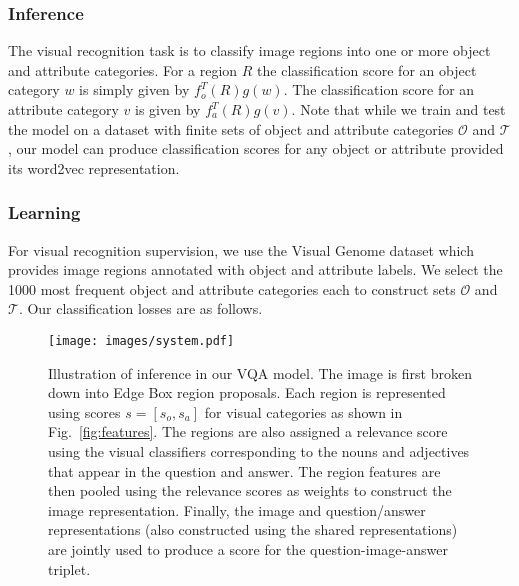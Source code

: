 \documentclass[10pt,twocolumn,letterpaper]{article}
\begin{document}
\subsubsection{Inference}\label{sec:recog_inference}
The visual recognition task is to classify image regions into one or more object and attribute categories. For a region $R$ the classification score for an object category $w$ is simply given by $f_o^T(R)g(w)$. The classification score for an attribute category $v$ is given by $f_a^T(R)g(v)$. Note that while we train and test the model on a dataset with finite sets of object and attribute categories $\mathcal{O}$ and $\mathcal{T}$, our model can produce classification scores for any object or attribute provided its word2vec representation.

\subsubsection{Learning}\label{sec:recog_learn}
For visual recognition supervision, we use the Visual Genome dataset which provides image regions annotated with object and attribute labels. We select the 1000 most frequent object and attribute categories each to construct sets $\mathcal{O}$ and $\mathcal{T}$. Our classification losses are as follows.\\

\begin{figure*}
\begin{center}
\texttt{[image: images/system.pdf]}
\vspace{-1.1cm}
\end{center}
  \caption{Illustration of inference in our VQA model. The image is first broken down into Edge Box region proposals\cite{zitnick2014edge}. Each region is represented using scores $s = [s_o, s_a]$ for visual categories as shown in Fig.~\ref{fig:features}. The regions are also assigned a relevance score using the visual classifiers corresponding to the nouns and adjectives that appear in the question and answer. The region features are then pooled using the relevance scores as weights to construct the image representation. Finally, the image and question/answer representations (also constructed using the shared representations) are jointly used to produce a score for the question-image-answer triplet.}
\label{fig:system}
\end{figure*}
\end{document}
